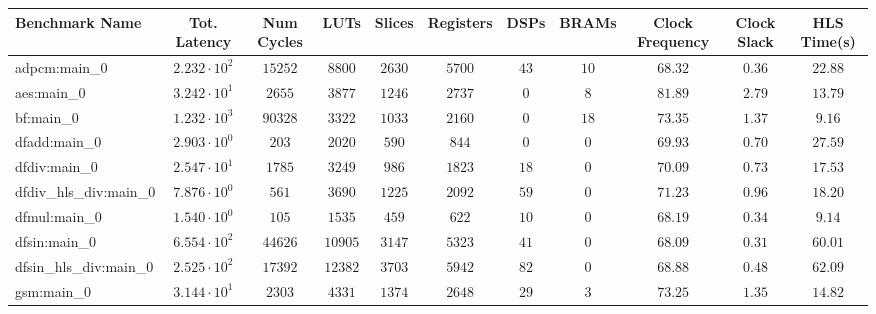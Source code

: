 \begin{tabular}{|l|c|c|c|c|c|c|c|c|c|c|}
\hline
Benchmark Name          & Tot. Latency           & Num Cycles & LUTs      & Slices    & Registers & DSPs    & BRAMs   & Clock Frequency & Clock Slack & HLS Time(s) \\
\hline
adpcm:main\_0           & $ 2.232 \cdot 10^{2} $ & $ 15252  $ & $ 8800  $ & $ 2630  $ & $ 5700  $ & $ 43  $ & $ 10  $ & $ 68.32       $ & $ 0.36    $ & $ 22.88   $ \\
aes:main\_0             & $ 3.242 \cdot 10^{1} $ & $ 2655   $ & $ 3877  $ & $ 1246  $ & $ 2737  $ & $ 0   $ & $ 8   $ & $ 81.89       $ & $ 2.79    $ & $ 13.79   $ \\
bf:main\_0              & $ 1.232 \cdot 10^{3} $ & $ 90328  $ & $ 3322  $ & $ 1033  $ & $ 2160  $ & $ 0   $ & $ 18  $ & $ 73.35       $ & $ 1.37    $ & $ 9.16    $ \\
dfadd:main\_0           & $ 2.903 \cdot 10^{0} $ & $ 203    $ & $ 2020  $ & $ 590   $ & $ 844   $ & $ 0   $ & $ 0   $ & $ 69.93       $ & $ 0.70    $ & $ 27.59   $ \\
dfdiv:main\_0           & $ 2.547 \cdot 10^{1} $ & $ 1785   $ & $ 3249  $ & $ 986   $ & $ 1823  $ & $ 18  $ & $ 0   $ & $ 70.09       $ & $ 0.73    $ & $ 17.53   $ \\
dfdiv\_hls\_div:main\_0 & $ 7.876 \cdot 10^{0} $ & $ 561    $ & $ 3690  $ & $ 1225  $ & $ 2092  $ & $ 59  $ & $ 0   $ & $ 71.23       $ & $ 0.96    $ & $ 18.20   $ \\
dfmul:main\_0           & $ 1.540 \cdot 10^{0} $ & $ 105    $ & $ 1535  $ & $ 459   $ & $ 622   $ & $ 10  $ & $ 0   $ & $ 68.19       $ & $ 0.34    $ & $ 9.14    $ \\
dfsin:main\_0           & $ 6.554 \cdot 10^{2} $ & $ 44626  $ & $ 10905 $ & $ 3147  $ & $ 5323  $ & $ 41  $ & $ 0   $ & $ 68.09       $ & $ 0.31    $ & $ 60.01   $ \\
dfsin\_hls\_div:main\_0 & $ 2.525 \cdot 10^{2} $ & $ 17392  $ & $ 12382 $ & $ 3703  $ & $ 5942  $ & $ 82  $ & $ 0   $ & $ 68.88       $ & $ 0.48    $ & $ 62.09   $ \\
gsm:main\_0             & $ 3.144 \cdot 10^{1} $ & $ 2303   $ & $ 4331  $ & $ 1374  $ & $ 2648  $ & $ 29  $ & $ 3   $ & $ 73.25       $ & $ 1.35    $ & $ 14.82   $ \\

\end{tabular}
